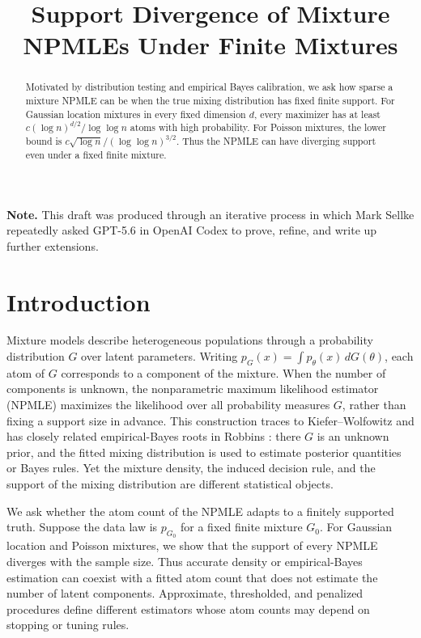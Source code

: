 \documentclass[11pt]{article}
\title{Support Divergence of Mixture NPMLEs Under Finite Mixtures}
\author{}
\date{}
\theoremstyle{definition}
\numberwithin{equation}{section}
\begin{document}
\maketitle

\begin{abstract}
Motivated by distribution testing and empirical Bayes calibration, we ask how sparse a mixture NPMLE can be when the true mixing distribution has fixed finite support. For Gaussian location mixtures in every fixed dimension \(d\), every maximizer has at least \(c(\log n)^{d/2}/\log\log n\) atoms with high probability. For Poisson mixtures, the lower bound is \(c\sqrt{\log n}/(\log\log n)^{3/2}\). Thus the NPMLE can have diverging support even under a fixed finite mixture.
\end{abstract}

\medskip
\noindent\textbf{Note.} This draft was produced through an iterative process in which Mark Sellke repeatedly asked GPT-5.6 in OpenAI Codex to prove, refine, and write up further extensions.
\medskip

\setcounter{tocdepth}{2}
\tableofcontents

\section{Introduction}

Mixture models describe heterogeneous populations through a probability
distribution \(G\) over latent parameters. Writing
\(p_G(x)=\int p_\theta(x)\,dG(\theta)\), each atom of \(G\) corresponds to a
component of the mixture. When the number of components is unknown, the
nonparametric maximum likelihood estimator (NPMLE) maximizes the likelihood
over all probability measures \(G\), rather than fixing a support size in
advance. This construction traces to Kiefer--Wolfowitz
\cite{kiefer1956consistency} and has closely related empirical-Bayes roots in
Robbins \cite{robbins1950generalization}: there \(G\) is an unknown prior,
and the fitted mixing distribution is used to estimate posterior quantities
or Bayes rules. Yet the mixture density, the induced decision rule, and the
support of the mixing distribution are different statistical objects.

We ask whether the atom count of the NPMLE adapts to a finitely supported
truth. Suppose the data law is \(p_{G_0}\) for a fixed finite mixture
\(G_0\). For Gaussian location and Poisson mixtures, we show that the support
of every NPMLE diverges with the sample size. Thus accurate density or
empirical-Bayes estimation can coexist with a fitted atom count that does not
estimate the number of latent components. Approximate, thresholded, and
penalized procedures define different estimators whose atom counts may
depend on stopping or tuning rules.
\end{document}
